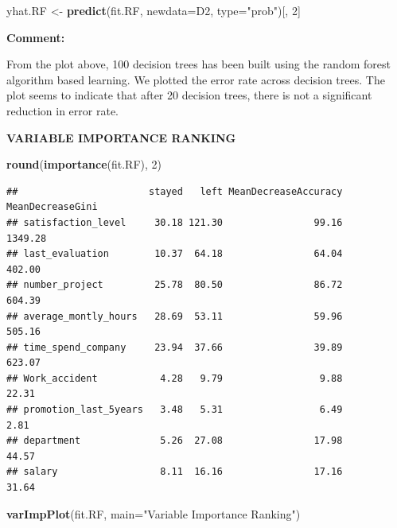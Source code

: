 \documentclass[
  11pt,
]{article}
\newenvironment{Shaded}{\begin{snugshade}}{\end{snugshade}}
\newcommand{\AttributeTok}[1]{\textcolor[rgb]{0.13,0.29,0.53}{#1}}
\newcommand{\DecValTok}[1]{\textcolor[rgb]{0.00,0.00,0.81}{#1}}
\newcommand{\FunctionTok}[1]{\textcolor[rgb]{0.13,0.29,0.53}{\textbf{#1}}}
\newcommand{\NormalTok}[1]{#1}
\newcommand{\OtherTok}[1]{\textcolor[rgb]{0.56,0.35,0.01}{#1}}
\newcommand{\StringTok}[1]{\textcolor[rgb]{0.31,0.60,0.02}{#1}}
\begin{document}
\begin{Shaded}
\begin{Highlighting}[]
\NormalTok{yhat.RF }\OtherTok{\textless{}{-}} \FunctionTok{predict}\NormalTok{(fit.RF, }\AttributeTok{newdata=}\NormalTok{D2, }\AttributeTok{type=}\StringTok{"prob"}\NormalTok{)[, }\DecValTok{2}\NormalTok{]}
\end{Highlighting}
\end{Shaded}

\hfill\break
\textbf{Comment:}

From the plot above, 100 decision trees has been built using the random
forest algorithm based learning. We plotted the error rate across
decision trees. The plot seems to indicate that after 20 decision trees,
there is not a significant reduction in error rate.

\hfill\break
\textbf{VARIABLE IMPORTANCE RANKING}

\begin{Shaded}
\begin{Highlighting}[]
\FunctionTok{round}\NormalTok{(}\FunctionTok{importance}\NormalTok{(fit.RF), }\DecValTok{2}\NormalTok{)}
\end{Highlighting}
\end{Shaded}

\begin{verbatim}
##                       stayed   left MeanDecreaseAccuracy MeanDecreaseGini
## satisfaction_level     30.18 121.30                99.16          1349.28
## last_evaluation        10.37  64.18                64.04           402.00
## number_project         25.78  80.50                86.72           604.39
## average_montly_hours   28.69  53.11                59.96           505.16
## time_spend_company     23.94  37.66                39.89           623.07
## Work_accident           4.28   9.79                 9.88            22.31
## promotion_last_5years   3.48   5.31                 6.49             2.81
## department              5.26  27.08                17.98            44.57
## salary                  8.11  16.16                17.16            31.64
\end{verbatim}

\begin{Shaded}
\begin{Highlighting}[]
\FunctionTok{varImpPlot}\NormalTok{(fit.RF, }\AttributeTok{main=}\StringTok{"Variable Importance Ranking"}\NormalTok{)}
\end{Highlighting}
\end{Shaded}
\end{document}
